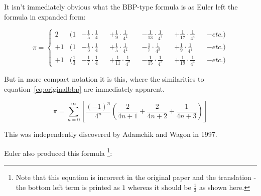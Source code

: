 \documentclass[11pt]{article}
\begin{document}
It isn't immediately obvious what the BBP-type formula is as Euler left the formula in expanded form:

\begin{equation*}
  \pi = \left \{
  \begin{aligned}
     2  &( 1            &- \tfrac{1}{5}\cdot\tfrac{1}{4} &&+ \tfrac{1}{9}\cdot\tfrac{1}{4^2}  &&- \tfrac{1}{13}\cdot\tfrac{1}{4^3} &&+ \tfrac{1}{17}\cdot\tfrac{1}{4^4} &&- etc. ) \\
    + 1 &( 1            &- \tfrac{1}{3}\cdot\tfrac{1}{4} &&+ \tfrac{1}{5}\cdot\tfrac{1}{4^2}  &&- \tfrac{1}{7}\cdot\tfrac{1}{4^3}  &&+ \tfrac{1}{9}\cdot\tfrac{1}{4^4}  &&- etc. ) \\
    + 1 &( \tfrac{1}{3} &- \tfrac{1}{7}\cdot\tfrac{1}{4} &&+ \tfrac{1}{11}\cdot\tfrac{1}{4^2} &&- \tfrac{1}{15}\cdot\tfrac{1}{4^3} &&+ \tfrac{1}{19}\cdot\tfrac{1}{4^4} &&- etc. )
  \end{aligned}
  \right.
\end{equation*}

But in more compact notation it is this, where the similarities to equation~\eqref{eq:originalbbp} are immediately apparent.

\begin{equation}  \label{eq:eulerbbp}
  \pi = \sum_{n = 0}^\infty \left[ \frac{(-1)^n}{4^n} \left( \frac{2}{4n + 1} + \frac{2}{4n + 2} + \frac{1}{4n + 3} \right) \right]
\end{equation}

This was independently discovered by Adamchik and Wagon \cite{Adamchik_Wagon_1997} in 1997.

Euler also produced this formula \footnote{Note that this equation is incorrect in the original paper and the translation - the bottom left term is printed as $1$ whereas it should be $\frac{1}{3}$ as shown here.}:
\end{document}
